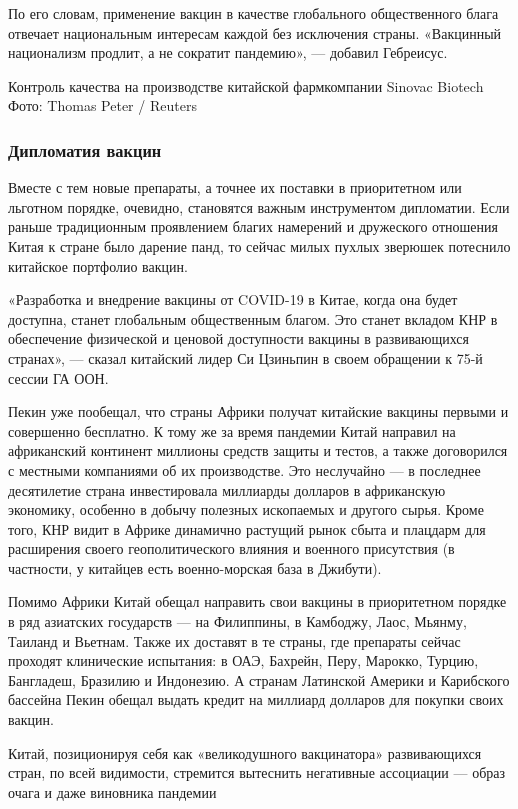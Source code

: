 По его словам, применение вакцин в качестве глобального общественного блага
отвечает национальным интересам каждой без исключения страны. «Вакцинный
национализм продлит, а не сократит пандемию», --- добавил Гебреисус.

Контроль качества на производстве китайской фармкомпании Sinovac Biotech Фото:
Thomas Peter / Reuters

\subsubsection{Дипломатия вакцин}

Вместе с тем новые препараты, а точнее их поставки в приоритетном или льготном
порядке, очевидно, становятся важным инструментом дипломатии. Если раньше
традиционным проявлением благих намерений и дружеского отношения Китая к стране
было дарение панд, то сейчас милых пухлых зверюшек потеснило китайское
портфолио вакцин.

«Разработка и внедрение вакцины от COVID-19 в Китае, когда она будет доступна,
станет глобальным общественным благом. Это станет вкладом КНР в обеспечение
физической и ценовой доступности вакцины в развивающихся странах», --- сказал
китайский лидер Си Цзиньпин в своем обращении к 75-й сессии ГА ООН.

Пекин уже пообещал, что страны Африки получат китайские вакцины первыми и
совершенно бесплатно. К тому же за время пандемии Китай направил на африканский
континент миллионы средств защиты и тестов, а также договорился с местными
компаниями об их производстве. Это неслучайно --- в последнее десятилетие страна
инвестировала миллиарды долларов в африканскую экономику, особенно в добычу
полезных ископаемых и другого сырья. Кроме того, КНР видит в Африке динамично
растущий рынок сбыта и плацдарм для расширения своего геополитического влияния
и военного присутствия (в частности, у китайцев есть военно-морская база в
Джибути).

Помимо Африки Китай обещал направить свои вакцины в приоритетном порядке в ряд
азиатских государств --- на Филиппины, в Камбоджу, Лаос, Мьянму, Таиланд и
Вьетнам. Также их доставят в те страны, где препараты сейчас проходят
клинические испытания: в ОАЭ, Бахрейн, Перу, Марокко, Турцию, Бангладеш,
Бразилию и Индонезию. А странам Латинской Америки и Карибского бассейна Пекин
обещал выдать кредит на миллиард долларов для покупки своих вакцин.

Китай, позиционируя себя как «великодушного вакцинатора» развивающихся стран,
по всей видимости, стремится вытеснить негативные ассоциации --- образ очага и
даже виновника пандемии

